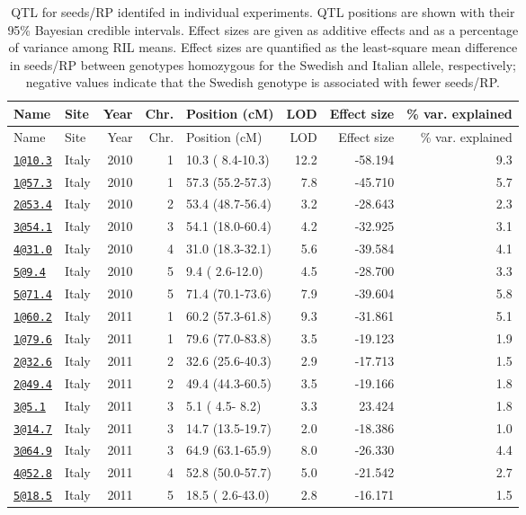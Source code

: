 \documentclass[]{article}
\begin{document}
\begin{longtable}[]{@{}llrrlrrr@{}}
\caption{\label{tab:individual-tofu-qtl}QTL for seeds/RP identifed in individual experiments. QTL positions are shown with their 95\% Bayesian credible intervals. Effect sizes are given as additive effects and as a percentage of variance among RIL means. Effect sizes are quantified as the least-square mean difference in seeds/RP between genotypes homozygous for the Swedish and Italian allele, respectively; negative values indicate that the Swedish genotype is associated with fewer seeds/RP.}\tabularnewline
\toprule
Name & Site & Year & Chr. & Position (cM) & LOD & Effect size & \% var. explained\tabularnewline
\midrule
\endfirsthead
\toprule
Name & Site & Year & Chr. & Position (cM) & LOD & Effect size & \% var. explained\tabularnewline
\midrule
\endhead
\href{mailto:1@10.3}{\nolinkurl{1@10.3}} & Italy & 2010 & 1 & 10.3 ( 8.4-10.3) & 12.2 & -58.194 & 9.3\tabularnewline
\href{mailto:1@57.3}{\nolinkurl{1@57.3}} & Italy & 2010 & 1 & 57.3 (55.2-57.3) & 7.8 & -45.710 & 5.7\tabularnewline
\href{mailto:2@53.4}{\nolinkurl{2@53.4}} & Italy & 2010 & 2 & 53.4 (48.7-56.4) & 3.2 & -28.643 & 2.3\tabularnewline
\href{mailto:3@54.1}{\nolinkurl{3@54.1}} & Italy & 2010 & 3 & 54.1 (18.0-60.4) & 4.2 & -32.925 & 3.1\tabularnewline
\href{mailto:4@31.0}{\nolinkurl{4@31.0}} & Italy & 2010 & 4 & 31.0 (18.3-32.1) & 5.6 & -39.584 & 4.1\tabularnewline
\href{mailto:5@9.4}{\nolinkurl{5@9.4}} & Italy & 2010 & 5 & 9.4 ( 2.6-12.0) & 4.5 & -28.700 & 3.3\tabularnewline
\href{mailto:5@71.4}{\nolinkurl{5@71.4}} & Italy & 2010 & 5 & 71.4 (70.1-73.6) & 7.9 & -39.604 & 5.8\tabularnewline
\href{mailto:1@60.2}{\nolinkurl{1@60.2}} & Italy & 2011 & 1 & 60.2 (57.3-61.8) & 9.3 & -31.861 & 5.1\tabularnewline
\href{mailto:1@79.6}{\nolinkurl{1@79.6}} & Italy & 2011 & 1 & 79.6 (77.0-83.8) & 3.5 & -19.123 & 1.9\tabularnewline
\href{mailto:2@32.6}{\nolinkurl{2@32.6}} & Italy & 2011 & 2 & 32.6 (25.6-40.3) & 2.9 & -17.713 & 1.5\tabularnewline
\href{mailto:2@49.4}{\nolinkurl{2@49.4}} & Italy & 2011 & 2 & 49.4 (44.3-60.5) & 3.5 & -19.166 & 1.8\tabularnewline
\href{mailto:3@5.1}{\nolinkurl{3@5.1}} & Italy & 2011 & 3 & 5.1 ( 4.5- 8.2) & 3.3 & 23.424 & 1.8\tabularnewline
\href{mailto:3@14.7}{\nolinkurl{3@14.7}} & Italy & 2011 & 3 & 14.7 (13.5-19.7) & 2.0 & -18.386 & 1.0\tabularnewline
\href{mailto:3@64.9}{\nolinkurl{3@64.9}} & Italy & 2011 & 3 & 64.9 (63.1-65.9) & 8.0 & -26.330 & 4.4\tabularnewline
\href{mailto:4@52.8}{\nolinkurl{4@52.8}} & Italy & 2011 & 4 & 52.8 (50.0-57.7) & 5.0 & -21.542 & 2.7\tabularnewline
\href{mailto:5@18.5}{\nolinkurl{5@18.5}} & Italy & 2011 & 5 & 18.5 ( 2.6-43.0) & 2.8 & -16.171 & 1.5\tabularnewline

\end{longtable}
\end{document}
